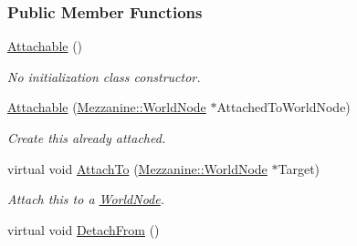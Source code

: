 \subsubsection*{Public Member Functions}
\begin{DoxyCompactItemize}
\item 
\hypertarget{classMezzanine_1_1Attachable_a798ba9c0839bb66aa1346c40a3da05ff}{
\hyperlink{classMezzanine_1_1Attachable_a798ba9c0839bb66aa1346c40a3da05ff}{Attachable} ()}
\label{classMezzanine_1_1Attachable_a798ba9c0839bb66aa1346c40a3da05ff}

\begin{DoxyCompactList}\small\item\em No initialization class constructor. \item\end{DoxyCompactList}\item 
\hyperlink{classMezzanine_1_1Attachable_ad8ab615ca85dc29144176be933cb1071}{Attachable} (\hyperlink{classMezzanine_1_1WorldNode}{Mezzanine::WorldNode} $\ast$AttachedToWorldNode)
\begin{DoxyCompactList}\small\item\em Create this already attached. \item\end{DoxyCompactList}\item 
virtual void \hyperlink{classMezzanine_1_1Attachable_af0c5263fef659fbd00dcd7e3d7e2d4e8}{AttachTo} (\hyperlink{classMezzanine_1_1WorldNode}{Mezzanine::WorldNode} $\ast$Target)
\begin{DoxyCompactList}\small\item\em Attach this to a \hyperlink{classMezzanine_1_1WorldNode}{WorldNode}. \item\end{DoxyCompactList}\item 
\hypertarget{classMezzanine_1_1Attachable_ae41d6e88cab4808e3658e38a64e1c12d}{
virtual void \hyperlink{classMezzanine_1_1Attachable_ae41d6e88cab4808e3658e38a64e1c12d}{DetachFrom} ()}
\label{classMezzanine_1_1Attachable_ae41d6e88cab4808e3658e38a64e1c12d}


\end{DoxyCompactItemize}
